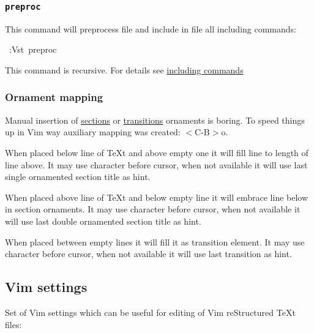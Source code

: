 \documentclass[12pt]{article}
\begin{document}
\hypertarget{l9696preproc9696}{}
\subsubsection{\texttt{preproc}}

This command will preprocess file and include in file all including commands:

\begin{ttfamily}\begin{flushleft}
\mbox{~:Vst~preproc}\\
\end{flushleft}\end{ttfamily}

This command is recursive. For details see \href{\#lincluding-commands}{including commands}

\hypertarget{lornament-mapping}{}
\subsubsection{Ornament mapping}

Manual insertion of \href{\#lsections}{sections} or \href{\#ltransitions}{transitions} ornaments is boring. To speed
things up in Vim way auxiliary mapping was created: $<$C-B$>$o.

When placed below line of \TeX{}t and above empty one it will fill line to length
of line above. It may use character before cursor, when not available it will
use last single ornamented section title as hint.

When placed above line of \TeX{}t and below empty line it will embrace line below
in section ornaments. It may use character before cursor, when not available it
will use last double ornamented section title as hint.

When placed between empty lines it will fill it as transition element. It may
use character before cursor, when not available it will use last transition as
hint.

\hypertarget{lvim-settings}{}
\subsection{Vim settings}

Set of Vim settings which can be useful for editing of Vim reStructured \TeX{}t files:
\end{document}
